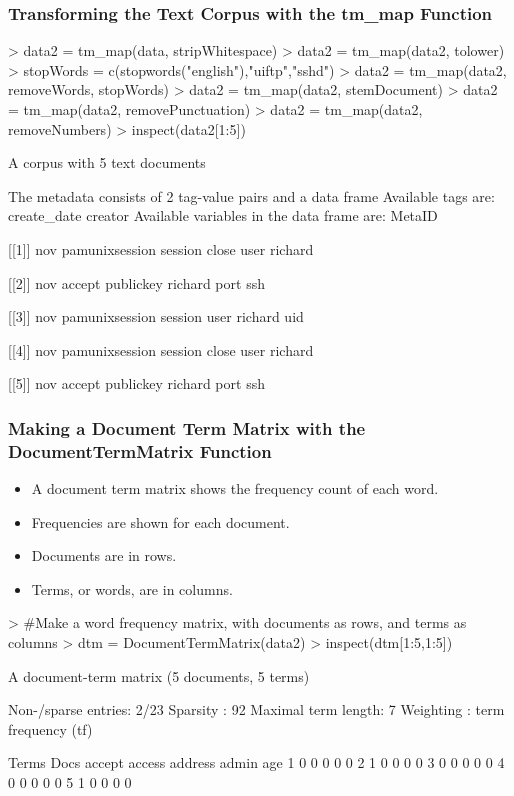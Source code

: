 \documentclass[compress,8pt]{beamer}
\begin{document}
\begin{frame}
\frametitle{Transforming the Text Corpus with the tm_map Function}    
\begin{Schunk}
\begin{Sinput}
> data2 = tm_map(data, stripWhitespace)
> data2 = tm_map(data2, tolower)
> stopWords = c(stopwords("english"),"uiftp","sshd")
> data2 = tm_map(data2, removeWords, stopWords)
> data2 = tm_map(data2, stemDocument)
> data2 = tm_map(data2, removePunctuation)
> data2 = tm_map(data2, removeNumbers)
> inspect(data2[1:5])
\end{Sinput}
A corpus with 5 text documents

The metadata consists of 2 tag-value pairs and a data frame
Available tags are:
  create_date creator 
Available variables in the data frame are:
  MetaID 

[[1]]
nov     pamunixsession session close  user richard

[[2]]
nov     accept publickey  richard   port  ssh

[[3]]
nov     pamunixsession session   user richard  uid

[[4]]
nov     pamunixsession session close  user richard

[[5]]
nov     accept publickey  richard   port  ssh\end{Schunk}
\end{frame}

\begin{frame}
\frametitle{Making a Document Term Matrix with the DocumentTermMatrix Function}  \begin{itemize}
\item A document term matrix shows the frequency count of each word.
\item Frequencies are shown for each document.
\item Documents are in rows.
\item Terms, or words, are in columns.
\end{itemize}  
\begin{Schunk}
\begin{Sinput}
> #Make a word frequency matrix, with documents as rows, and terms as columns
> dtm = DocumentTermMatrix(data2)
> inspect(dtm[1:5,1:5])
\end{Sinput}
A document-term matrix (5 documents, 5 terms)

Non-/sparse entries: 2/23
Sparsity           : 92%
Maximal term length: 7 
Weighting          : term frequency (tf)

    Terms
Docs accept access address admin age
   1      0      0       0     0   0
   2      1      0       0     0   0
   3      0      0       0     0   0
   4      0      0       0     0   0
   5      1      0       0     0   0\end{Schunk}
\end{frame}
\end{document}
